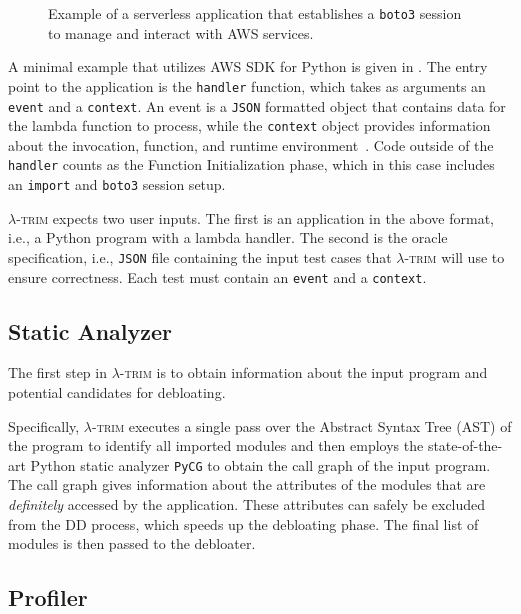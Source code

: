 \documentclass[sigplan,screen]{acmart}
\newcommand{\sys}{\textsc{\ensuremath{\lambda}-trim}\xspace}
\newcounter{example}
\begin{document}
\begin{figure}
    \centering
    \inputminted[fontsize=\scriptsize]{python}{chapters/design/handler.py}
    \caption{Example of a serverless application that establishes a \texttt{boto3} session to manage and interact with AWS services.}
    \label{fig:handler}
\end{figure}

A minimal example that utilizes AWS SDK for Python is given in .
The entry point to the application is the \texttt{handler} function, which takes as arguments an \texttt{event} and a \texttt{context}.
An event is a \texttt{JSON} formatted object that contains data for the lambda function to process, while the \texttt{context} object provides information about the invocation, function, and runtime environment~\cite{lambdaHandler}.
Code outside of the \texttt{handler} counts as the Function Initialization phase, which in this case includes an \texttt{import} and \texttt{boto3} session setup.

\sys expects two user inputs.
The first is an application in the above format, i.e., a Python program with a lambda handler.
The second is the oracle specification, i.e., \texttt{JSON} file containing the input test cases that \sys will use to ensure correctness.
Each test must contain an \texttt{event} and a \texttt{context}.

\subsection{Static Analyzer}\label{sec:static}

The first step in \sys is to obtain information about the input program and potential candidates for debloating.

Specifically, \sys executes a single pass over the Abstract Syntax Tree (AST) of the program to identify all imported modules and then employs the state-of-the-art Python static analyzer \texttt{PyCG} \cite{pycg2021} to obtain the call graph of the input program.
The call graph gives information about the attributes of the modules that are \textit{definitely} accessed by the application.
These attributes can safely be excluded from the DD process, which speeds up the debloating phase.
The final list of modules is then passed to the debloater.

 

\subsection{Profiler}\label{sec:profile}
\end{document}
